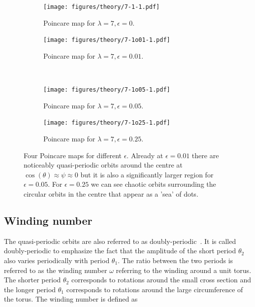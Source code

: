 \begin{figure}[H]
\centering
\begin{subfigure}[3a]{0.40\textwidth}
\texttt{[image: figures/theory/7-1-1.pdf]}
\caption{Poincare map for $\lambda = 7, \epsilon = 0$.}\label{fig:orbitmap1}
\end{subfigure}\hspace{1em}%
\begin{subfigure}[3b]{0.40\textwidth}
\texttt{[image: figures/theory/7-1o01-1.pdf]}
\caption{Poincare map for $\lambda = 7, \epsilon = 0.01$.}\label{fig:orbitmap2}
\end{subfigure} \\
\begin{subfigure}[3a]{0.40\textwidth}
\texttt{[image: figures/theory/7-1o05-1.pdf]}
\caption{Poincare map for $\lambda = 7, \epsilon = 0.05$.}\label{fig:orbitmap3}
\end{subfigure}\hspace{1em}%
	\begin{subfigure}[3b]{0.40\textwidth}
\texttt{[image: figures/theory/7-1o25-1.pdf]}
\caption{Poincare map for $\lambda = 7, \epsilon = 0.25$.}\label{fig:orbitmap4}
\end{subfigure} 
\caption{Four Poincare maps for different $\epsilon$. Already at $\epsilon = 0.01$ there are noticeably quasi-periodic 
orbits around the centre at $\cos(\theta) \approx \psi \approx 0$ but it is also a significantly larger region for $\epsilon = 0.05$. For $\epsilon = 0.25$ we can see chaotic orbits surrounding the circular orbits in the centre that appear as a 'sea' of dots.} %
\end{figure}

\subsection{Winding number} \label{sec:winding}
The quasi-periodic orbits are also referred to as doubly-periodic~\cite{Yarin}. It is called doubly-periodic to emphasize the fact that the amplitude of the short period $\theta_2$ also varies periodically with period $\theta_1$. The ratio between the two periods is referred to as the winding number $\omega$ referring to the winding around a unit torus. The shorter period $\theta_2$ corresponds to rotations around the small cross section and the longer period $\theta_1$ corresponds to rotations around the large circumference of the torus. The winding number is defined as \cite{introchaos}

